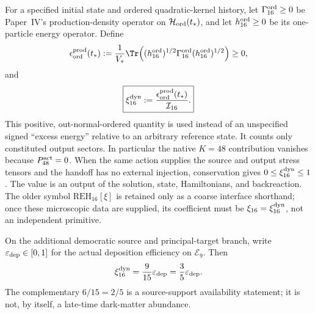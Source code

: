 \documentclass[12pt,a4paper]{article}
\begin{document}
\begin{definition}[Dynamical \(K=16\) production fraction]
\label{p8:def:dynamical-k16-production-fraction}
For a specified initial state and ordered quadratic-kernel history, let
\(\Gamma_{16}^{\rm ord}\ge0\) be Paper~IV's production-density operator on
\(\mathcal H_{\rm ord}(t_*)\), and let
\(h_{16}^{\rm ord}\ge0\) be its one-particle energy operator.  Define
\begin{equation}
 \label{p8:eq:dynamical-produced-energy-density}
 \epsilon_{\rm ord}^{\rm prod}(t_*)
 :=\frac1{V_*}\Tr\!\left(
 (h_{16}^{\rm ord})^{1/2}\Gamma_{16}^{\rm ord}
 (h_{16}^{\rm ord})^{1/2}\right)\ge0,
\end{equation}
and
\begin{equation}
 \label{p8:eq:dynamical-xi16}
 \boxed{\xi_{16}^{\rm dyn}
 :=\frac{\epsilon_{\rm ord}^{\rm prod}(t_*)}{\mathcal I_{16}}.}
\end{equation}
This positive, out-normal-ordered quantity is used instead of an unspecified
signed ``excess energy'' relative to an arbitrary reference state.  It counts
only constituted output sectors.  In particular the native \(K=48\)
contribution vanishes because \(P_{48}^{\rm act}=0\).
When the same action supplies the source and output stress tensors and the
handoff has no external injection, conservation gives
\(0\le\xi_{16}^{\rm dyn}\le1\).  The value is an output of the solution,
state, Hamiltonians, and backreaction.  The older symbol
\(\mathrm{REH}_{16}[\xi]\) is retained only as a coarse interface shorthand;
once these microscopic data are supplied, its coefficient must be
\(\xi_{16}=\xi_{16}^{\rm dyn}\), not an independent primitive.

On the additional democratic source and principal-target branch, write
\(\varepsilon_{\rm dep}\in[0,1]\) for the actual deposition efficiency on
\(\mathcal E_9\).  Then
\begin{equation}
 \label{p8:eq:dynamic-democratic-availability}
 \xi_{16}^{\rm dyn}=\frac{9}{15}\varepsilon_{\rm dep}
 =\frac35\varepsilon_{\rm dep}.
\end{equation}
The complementary \(6/15=2/5\) is a source-support availability statement;
it is not, by itself, a late-time dark-matter abundance.
\end{definition}
\end{document}
